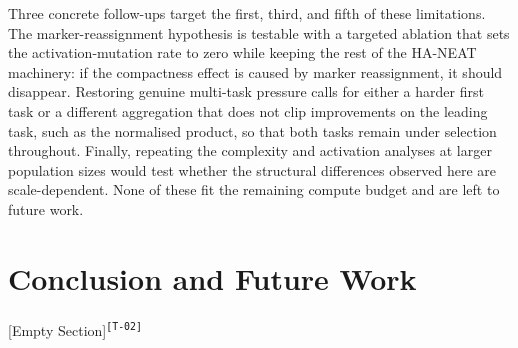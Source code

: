 \documentclass[12pt]{article}
\newcommand{\cohID}[1]{\textsuperscript{\scriptsize\texttt{[#1]}}}
\newcommand{\cohStructure}[2]{\textcolor{cohStructure}{#2}\cohID{#1}}
\begin{document}
Three concrete follow-ups target the first, third, and fifth of these limitations.
The marker-reassignment hypothesis is testable with a targeted ablation that sets the activation-mutation rate to zero while keeping the rest of the HA-NEAT machinery: if the compactness effect is caused by marker reassignment, it should disappear.
Restoring genuine multi-task pressure calls for either a harder first task or a different aggregation that does not clip improvements on the leading task, such as the normalised product, so that both tasks remain under selection throughout.
Finally, repeating the complexity and activation analyses at larger population sizes would test whether the structural differences observed here are scale-dependent.
None of these fit the remaining compute budget and are left to future work.




\section{Conclusion and Future Work}
\label{sec:conclusion-and-future-work}

\cohStructure{T-02}{[Empty Section]}

\clearpage \printbibliography
\end{document}
